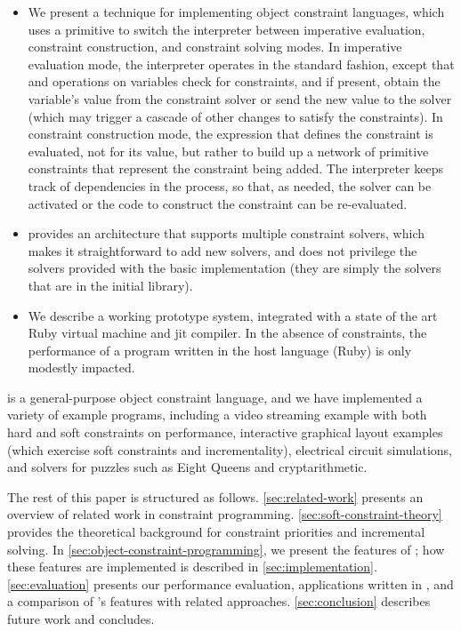 \begin{itemize}
\item We present a technique for implementing object constraint
  languages, which uses a primitive to switch the interpreter between
  imperative evaluation, constraint construction, and constraint
  solving modes.  In imperative evaluation mode, the interpreter
  operates in the standard fashion, except that \load and \store
  operations on variables check for constraints, and if present,
  obtain the variable's value from the
  constraint solver or send the new value to the solver (which may
  trigger a cascade of other changes to satisfy the constraints).  In
  constraint construction mode, the expression that defines the
  constraint is evaluated, not for its value, but rather to build up a
  network of primitive constraints that represent the constraint being
  added.  The interpreter keeps track of dependencies in the process,
  so that, as needed, the solver can be activated or the code to
  construct the constraint can be re-evaluated.
\item \langname provides an architecture \DIFdelbegin {}\DIFdelend that supports multiple
  constraint solvers, which makes it straightforward to add new
  solvers, and \DIFdelbegin {}\DIFdelend \DIFaddbegin {}\DIFaddend does not privilege the solvers provided with the
  basic implementation (they are simply the solvers that are in the
  initial library).
\item We describe a working prototype system, integrated with a state
  of the art Ruby virtual machine and \ac{jit} compiler. In the
  absence of constraints, the performance of a program written in the
  host language (Ruby) is only modestly impacted.
\end{itemize}

\toolname is a general-purpose object constraint language, and we have
implemented a variety of example programs, including a video streaming
example with both hard and soft constraints on performance,
interactive graphical layout examples (which exercise soft constraints
and incrementality), electrical circuit simulations, and solvers for
puzzles such as Eight Queens and cryptarithmetic.

The rest of this paper is structured as
follows. \autoref{sec:related-work} presents an overview of related
work in constraint programming. \autoref{sec:soft-constraint-theory}
provides the theoretical background for constraint priorities and
incremental solving. In \autoref{sec:object-constraint-programming},
we present the features of \langname; how these features are
implemented is described in
\autoref{sec:implementation}. \autoref{sec:evaluation} presents our
performance evaluation, applications written in \toolname, and a
comparison of \langname's features with related
approaches. \autoref{sec:conclusion} describes future work and
concludes.  \DIFaddbegin {}\langname {}\DIFaddend 

